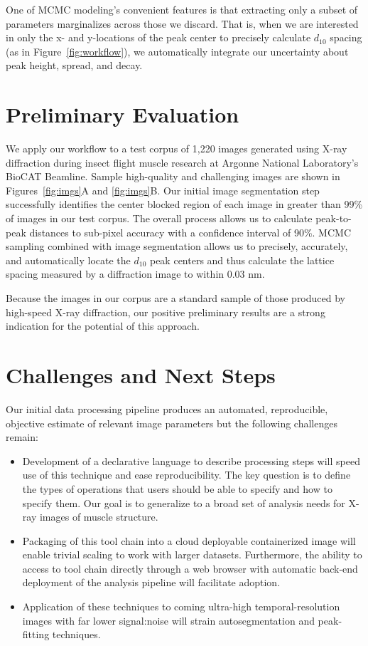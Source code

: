 \documentclass{sig-alternate}
\begin{document}
One of MCMC modeling's convenient features is that extracting only a
subset of parameters marginalizes across those we discard. That is,
when we are interested in only the x- and y-locations of the peak
center to precisely calculate $d_{10}$ spacing (as in
Figure~\ref{fig:workflow}), we automatically integrate our uncertainty
about peak height, spread, and decay.


\section{Preliminary Evaluation}
\label{sec:eval}

We apply our workflow to a test corpus of 1,220 images generated using
X-ray diffraction during insect flight muscle research at Argonne
National Laboratory's BioCAT Beamline. Sample high-quality and
challenging images are shown in Figures~\ref{fig:imgs}A and
\ref{fig:imgs}B.  Our initial image segmentation step successfully
identifies the center blocked region of each image in greater than
99\% of images in our test corpus. The overall process allows us to
calculate peak-to-peak distances to sub-pixel accuracy with a
confidence interval of 90\%. MCMC sampling combined with image
segmentation allows us to precisely, accurately, and automatically
locate the $d_{10}$ peak centers and thus calculate the lattice
spacing measured by a diffraction image to within 0.03 nm.

Because the images in our corpus are a standard sample of those
produced by high-speed X-ray diffraction, our positive preliminary
results are a strong indication for the potential of this approach.


\section{Challenges and Next Steps}
\label{sec:challenges}

Our initial data processing pipeline produces an automated,
reproducible, objective estimate of relevant image parameters but the
following challenges remain:

\begin{itemize}[noitemsep]
\item Development of a declarative language to describe processing
    steps will speed use of this technique and ease reproducibility.
    The key question is to define the types of operations that users
    should be able to specify and how to specify them. Our goal is to
    generalize to a broad set of analysis needs for X-ray images of
    muscle structure.
\item Packaging of this tool chain into a cloud deployable
    containerized image will enable trivial scaling to work with
    larger datasets. Furthermore, the ability to access to tool chain
    directly through a web browser with automatic back-end deployment
    of the analysis pipeline will facilitate adoption. 
\item Application of these techniques to coming ultra-high
    temporal-resolution images with far lower signal:noise will strain
    autosegmentation and peak-fitting techniques. 
\end{itemize}
\end{document}
